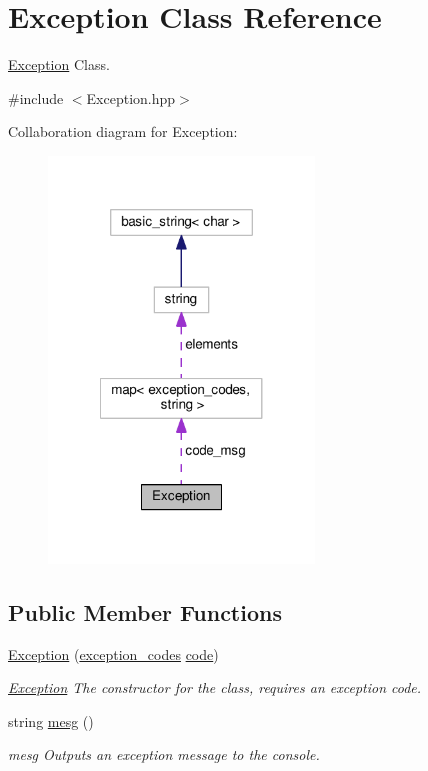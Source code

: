 \hypertarget{class_exception}{\section{Exception Class Reference}
\label{class_exception}
}


\hyperlink{class_exception}{Exception} Class.  




{\ttfamily \#include $<$Exception.\-hpp$>$}



Collaboration diagram for Exception\-:\nopagebreak
\begin{figure}[H]
\begin{center}
\leavevmode
\includegraphics[width=200pt]{class_exception__coll__graph}
\end{center}
\end{figure}
\subsection*{Public Member Functions}
\begin{DoxyCompactItemize}
\item 
\hyperlink{class_exception_a8399a723aeecd6605a083ca6ad0ba5ee}{Exception} (\hyperlink{_exception_8hpp_a7913b361832b19772aa960f7caa626dd}{exception\-\_\-codes} \hyperlink{class_exception_a9aa58ee0368fb1bfbc2335e3f4114aee}{code})
\begin{DoxyCompactList}\small\item\em \hyperlink{class_exception}{Exception} The constructor for the class, requires an exception code. \end{DoxyCompactList}\item 
string \hyperlink{class_exception_a2fcdf81ddb36b0c8700d4983620976e7}{mesg} ()
\begin{DoxyCompactList}\small\item\em mesg Outputs an exception message to the console. \end{DoxyCompactList}\end{DoxyCompactItemize}
